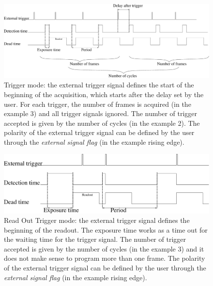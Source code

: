 \begin{figure}
\begin{center}
\includegraphics[width=\textwidth]{images/trigger_acquisition.eps}
\end{center}
\caption{Trigger mode: the external trigger signal defines the start of the beginning of the acquisition, which starts after the delay set by the user. For each trigger, the number of frames is acquired (in the example 3) and all trigger signals ignored. The number of trigger accepted is given by the number of cycles (in the example 2). The polarity of the external trigger signal can be defined by the user through the \textit{external signal flag} (in the example rising edge).}\label{fig:trig}
\end{figure}


\begin{figure}
\begin{center}
\includegraphics[width=\textwidth]{images/ro_trigger_acquisition.eps}
\end{center}
\caption{Read Out Trigger mode: the external trigger signal defines the beginning of the readout. The exposure time works as a time out for the waiting time for the trigger signal. The number of trigger accepted is given by the number of cycles (in the example 3) and it does not make sense to program more than one frame. The polarity of the external trigger signal can be defined by the user through the \textit{external signal flag} (in the example rising edge).}\label{fig:trig}
\end{figure}


